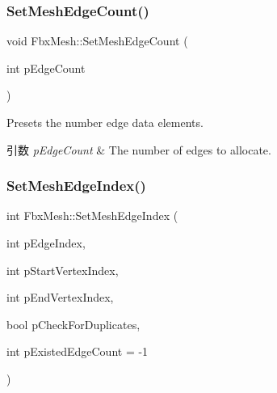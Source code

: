 \subsubsection{\texorpdfstring{Set\+Mesh\+Edge\+Count()}{SetMeshEdgeCount()}}
{\footnotesize\ttfamily void Fbx\+Mesh\+::\+Set\+Mesh\+Edge\+Count (\begin{DoxyParamCaption}\item[{int}]{p\+Edge\+Count }\end{DoxyParamCaption})}

Presets the number edge data elements. 
\begin{DoxyParams}{引数}
{\em p\+Edge\+Count} & The number of edges to allocate. \\
\hline
\end{DoxyParams}
\mbox{\label{class_fbx_mesh_aa5b7cc2518716a2718aa4dc74c028bfa}} 
\subsubsection{\texorpdfstring{Set\+Mesh\+Edge\+Index()}{SetMeshEdgeIndex()}\hspace{0.1cm}{\footnotesize\ttfamily [1/2]}}
{\footnotesize\ttfamily int Fbx\+Mesh\+::\+Set\+Mesh\+Edge\+Index (\begin{DoxyParamCaption}\item[{int}]{p\+Edge\+Index,  }\item[{int}]{p\+Start\+Vertex\+Index,  }\item[{int}]{p\+End\+Vertex\+Index,  }\item[{bool}]{p\+Check\+For\+Duplicates,  }\item[{int}]{p\+Existed\+Edge\+Count = {\ttfamily -\/1} }\end{DoxyParamCaption})}

